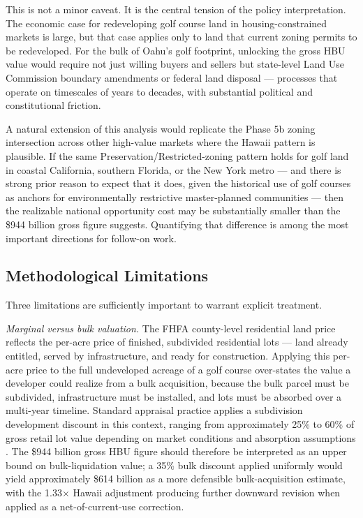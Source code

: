 \documentclass[11pt, letterpaper]{article}
\begin{document}
This is not a minor caveat. It is the central tension of the policy interpretation. The economic case for redeveloping golf course land in housing-constrained markets is large, but that case applies only to land that current zoning permits to be redeveloped. For the bulk of Oahu's golf footprint, unlocking the gross HBU value would require not just willing buyers and sellers but state-level Land Use Commission boundary amendments or federal land disposal --- processes that operate on timescales of years to decades, with substantial political and constitutional friction.

A natural extension of this analysis would replicate the Phase 5b zoning intersection across other high-value markets where the Hawaii pattern is plausible. If the same Preservation/Restricted-zoning pattern holds for golf land in coastal California, southern Florida, or the New York metro --- and there is strong prior reason to expect that it does, given the historical use of golf courses as anchors for environmentally restrictive master-planned communities --- then the realizable national opportunity cost may be substantially smaller than the \$944 billion gross figure suggests. Quantifying that difference is among the most important directions for follow-on work.

\subsection{Methodological Limitations}

Three limitations are sufficiently important to warrant explicit treatment.

\textit{Marginal versus bulk valuation.} The FHFA county-level residential land price reflects the per-acre price of finished, subdivided residential lots --- land already entitled, served by infrastructure, and ready for construction. Applying this per-acre price to the full undeveloped acreage of a golf course over-states the value a developer could realize from a bulk acquisition, because the bulk parcel must be subdivided, infrastructure must be installed, and lots must be absorbed over a multi-year timeline. Standard appraisal practice applies a subdivision development discount in this context, ranging from approximately 25\% to 60\% of gross retail lot value depending on market conditions and absorption assumptions \parencite{AppraisalInstitute2020}. The \$944 billion gross HBU figure should therefore be interpreted as an upper bound on bulk-liquidation value; a 35\% bulk discount applied uniformly would yield approximately \$614 billion as a more defensible bulk-acquisition estimate, with the 1.33$\times$ Hawaii adjustment producing further downward revision when applied as a net-of-current-use correction.
\end{document}
